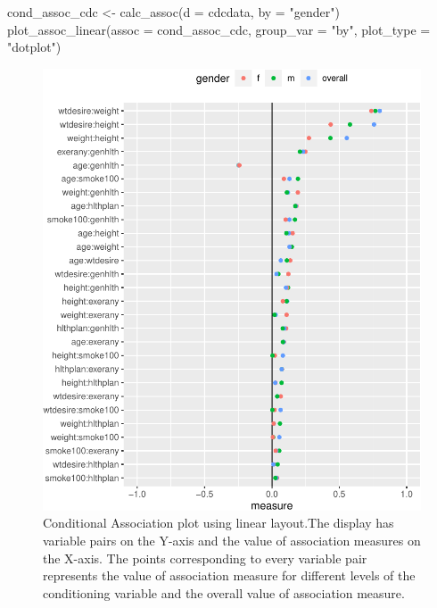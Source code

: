 \begin{Schunk}
\begin{Sinput}
cond_assoc_cdc <- calc_assoc(d = cdcdata, 
                             by = "gender")
plot_assoc_linear(assoc = cond_assoc_cdc,
                  group_var = "by",
                  plot_type = "dotplot")
\end{Sinput}
\begin{figure}

{\centering \includegraphics{rj_paper_files/figure-latex/linear-cond-assoc-1} 

}

\caption[Conditional Association plot using linear layout.The display has variable pairs on the Y-axis and the value of association measures on the X-axis]{Conditional Association plot using linear layout.The display has variable pairs on the Y-axis and the value of association measures on the X-axis. The points corresponding to every variable pair represents the value of association measure for different levels of the conditioning variable and the overall value of association measure.}\label{fig:linear-cond-assoc}
\end{figure}
\end{Schunk}

